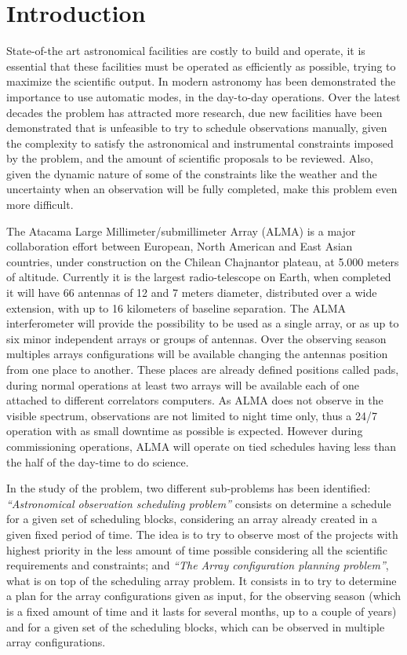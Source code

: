 \chapter{Introduction}

State-of-the art astronomical facilities are costly to build and operate, it is essential that these facilities 
must be operated as efficiently as possible, trying to maximize the scientific output. In modern astronomy has been
demonstrated the importance to use automatic modes, in the day-to-day operations.
Over the latest decades the problem has attracted more research, due new facilities have been
demonstrated that is unfeasible to try to schedule observations manually, given the complexity to satisfy
the astronomical and instrumental constraints imposed by the problem, and the amount of scientific
proposals to be reviewed. Also, given the dynamic nature of some of the constraints like the weather and
the uncertainty when an observation will be fully completed, make this problem even more difficult.

The Atacama Large Millimeter/submillimeter Array (ALMA) is a major collaboration effort between
European, North American and East Asian countries, under construction on the Chilean Chajnantor
plateau, at 5.000 meters of altitude. Currently it is the largest radio-telescope on Earth, when completed it
will have 66 antennas of 12 and 7 meters diameter, distributed over a wide extension, with up to 16 kilometers
of baseline separation. The ALMA interferometer will provide the possibility to be used as a single
array, or as up to six minor independent arrays or groups of antennas. Over the observing season
multiples arrays configurations will be available changing the antennas position from one place to
another. These places are already defined positions called pads, during normal operations at least two
arrays will be available each of one attached to different correlators computers. As ALMA does not
observe in the visible spectrum, observations are not limited to night time only, thus a 24/7 operation
with as small downtime as possible is expected. However during commissioning operations, ALMA will operate on tied schedules having less than the half of the day-time to do science.

In the study of the problem, two different sub-problems has been identified: \textit{``Astronomical observation scheduling problem''} 
consists on determine a schedule for a given set of scheduling blocks, considering an array already created in a given fixed
period of time. The idea is to try to observe most of the projects with highest priority in the less amount
of time possible considering all the scientific requirements and constraints; and \textit{``The  Array configuration planning problem''}, what  
is on top of the scheduling array problem. It consists in to try to determine a plan for the array configurations given as input,
for the observing season (which is a fixed amount of time and it lasts for several months, up
to a couple of years) and for a given set of the scheduling blocks, which can be observed in
multiple array configurations.

